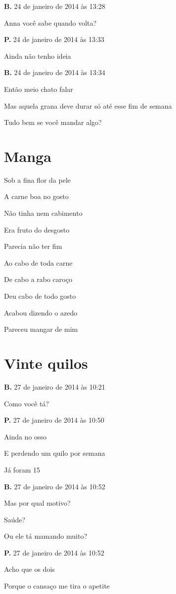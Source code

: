{\parindent0pt\parskip1pt\raggedright
\textbf{B.} 24 de janeiro de 2014 às 13:28

Anna você sabe quando volta?

\textbf{P.} 24 de janeiro de 2014 às 13:33

Ainda não tenho ideia

\textbf{B.} 24 de janeiro de 2014 às 13:34

Então meio chato falar

Mas aquela grana deve durar só até esse fim de semana

Tudo bem se você mandar algo?


\chapter{Manga}\label{manga}

Sob a fina flor da pele

A carne boa no gosto

Não tinha nem cabimento

Era fruto do desgosto

Parecia não ter fim\medskip

Ao cabo de toda carne

De cabo a rabo caroço

 Deu cabo de todo gosto

Acabou dizendo o azedo

Pareceu mangar de mim




\chapter{Vinte quilos}

\textbf{B.} 27 de janeiro de 2014 às 10:21

Como você tá?

\textbf{P.} 27 de janeiro de 2014 às 10:50

Ainda no osso

E perdendo um quilo por semana

Já foram 15

\textbf{B.} 27 de janeiro de 2014 às 10:52

Mas por qual motivo?

Saúde?

Ou ele tá mamando muito?

\textbf{P.} 27 de janeiro de 2014 às 10:52

Acho que os dois

Porque o cansaço me tira o apetite

}
